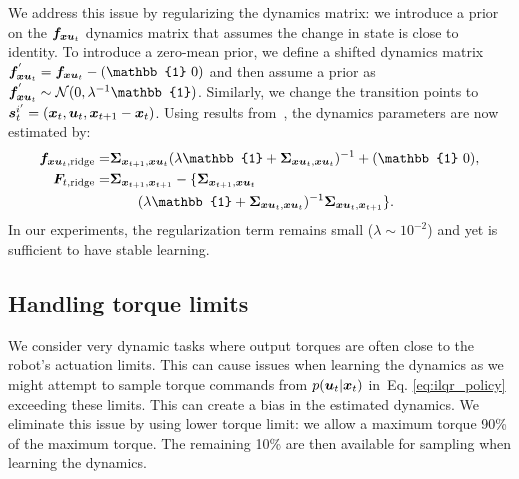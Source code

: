 We address this issue by regularizing the dynamics matrix: we introduce a prior on the $\bm{f}_{\bm{xu}_t}$ dynamics matrix that assumes the change in state is close to identity.
To introduce a zero-mean prior, we define a shifted dynamics matrix $\fxutreg = \fxut - (\mathbb{1}~\huge0)$ and then assume a prior as $\fxutreg \sim \mathcal{N}(0, \lambda^{-1} \mathbb{1})$. Similarly, we change the transition points to $\bm{s}^{i'}_t=(\bm{x}_{t}, \bm{u}_{t}, \bm{x}_{t + 1} - \bm{x}_{t})$. Using results from~\cite[Section 3.4]{williams1998prediction}, the dynamics parameters are now estimated by:
%
\begin{align}
\b{f}_{\b{xu}_t, \textrm{ridge}}  =& \b{\Sigma}_{\xtt, \b{xu}_t} (\lambda \mathbb{1} + \b{\Sigma}_{\b{xu}_{t}, \b{xu}_{t}})^{-1} \label{eq:dyn_fxut_ridge} + (\mathbb{1}~\huge0), \\
\b{F}_{t, \textrm{ridge}}     = &\label{eq:prob_dyn_covar_ridge}
        \b{\Sigma}_{{\xtt},{\xtt}} - \{\b{\Sigma}_{{\xtt}, \b{xu}_{t}}  \\& \nonumber
        \qquad(\lambda \mathbb{1} + \b{\Sigma}_{\b{xu}_{t}, \b{xu}_{t}})^{-1} \b{\Sigma}_{\b{xu}_{t},\xtt} \}.
\end{align}
In our experiments, the regularization term remains small ($\lambda \sim 10^{-2}$) and yet is
sufficient to have stable learning.
%
\subsection{Handling torque limits}
%
We consider very dynamic tasks where output torques are often close to the robot's actuation limits.
This can cause issues when learning the dynamics as we might attempt to sample torque commands from $p(\bm{u}_{t}|\bm{x}_{t})$ in~Eq. \eqref{eq:ilqr_policy} exceeding these limits. This can create a bias in the estimated dynamics. We eliminate this issue by using lower torque limit: we allow a maximum torque 90\% of the maximum torque. The remaining 10\% are then available for sampling when learning the dynamics.
%
\begingroup
{}
